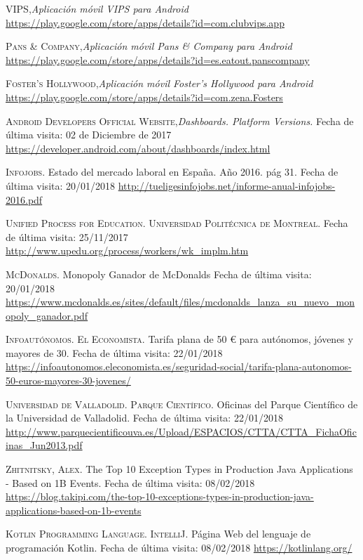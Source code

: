 \documentclass[twoside]{report}
\begin{document}
\begin{thebibliography}{a}
 \textsc{VIPS},\textit{Aplicación móvil VIPS para Android} \url{https://play.google.com/store/apps/details?id=com.clubvips.app}

 \textsc{Pans \& Company},\textit{Aplicación móvil Pans \& Company para Android} \url{https://play.google.com/store/apps/details?id=es.eatout.panscompany}

 \textsc{Foster's Hollywood},\textit{Aplicación móvil Foster's Hollywood para Android} \url{https://play.google.com/store/apps/details?id=com.zena.Fosters}

 \textsc{Android Developers Official Website},\textit{Dashboards. Platform Versions.} Fecha de última visita: 02 de Diciembre de 2017 \url{https://developer.android.com/about/dashboards/index.html}

 \textsc{Infojobs}. Estado del mercado laboral en España. Año 2016. pág 31. Fecha de última visita: 20/01/2018 \url{http://tueligesinfojobs.net/informe-anual-infojobs-2016.pdf} 

 \textsc{Unified Process for Education. Universidad Politécnica de Montreal}. Fecha de última visita: 25/11/2017 \url{http://www.upedu.org/process/workers/wk_implm.htm}

 \textsc{McDonalds}. Monopoly Ganador de McDonalds Fecha de última visita: 20/01/2018 \url{https://www.mcdonalds.es/sites/default/files/mcdonalds_lanza_su_nuevo_monopoly_ganador.pdf}

 \textsc{Infoautónomos. El Economista}. Tarifa plana de 50 \euro \hspace{0.1cm} para autónomos, jóvenes y mayores de 30. Fecha de última visita: 22/01/2018 \url{https://infoautonomos.eleconomista.es/seguridad-social/tarifa-plana-autonomos-50-euros-mayores-30-jovenes/}

 \textsc{Universidad de Valladolid. Parque Científico}. Oficinas del Parque Científico de la Universidad de Valladolid. Fecha de última visita: 22/01/2018 \url{http://www.parquecientificouva.es/Upload/ESPACIOS/CTTA/CTTA_FichaOficinas_Jun2013.pdf}

 \textsc{Zhitnitsky, Alex}. The Top 10 Exception Types in Production Java Applications - Based on 1B Events. Fecha de última visita: 08/02/2018 \url{https://blog.takipi.com/the-top-10-exceptions-types-in-production-java-applications-based-on-1b-events}

 \textsc{Kotlin Programming Language. IntelliJ}. Página Web del lenguaje de programación Kotlin. Fecha de última visita: 08/02/2018 \url{https://kotlinlang.org/}


\end{thebibliography}
\end{document}
